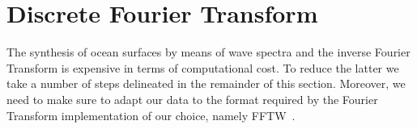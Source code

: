 \section{Discrete Fourier Transform}
\label{sec:discrete_fourier_transform}
The synthesis of ocean surfaces by means of wave spectra and the inverse Fourier
Transform is expensive in terms of computational cost. To reduce the latter we
take a number of steps delineated in the remainder of this section.
Moreover, we need to make sure to adapt our data to the format required by the
Fourier Transform implementation of our choice, namely FFTW~\citep{FFTW05}.

%
